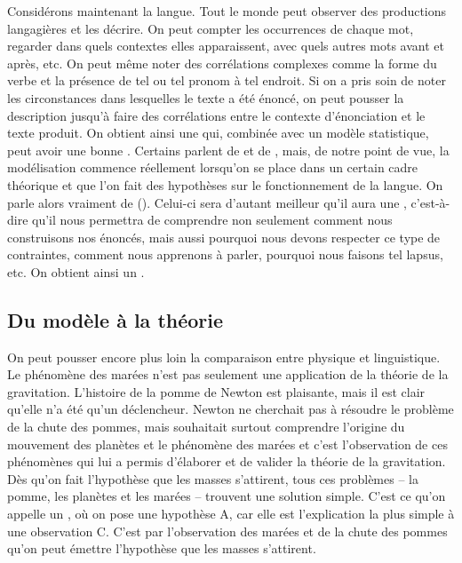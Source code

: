 Considérons maintenant la langue. Tout le monde peut observer des productions langagières et les décrire. On peut compter les occurrences de chaque mot, regarder dans quels contextes elles apparaissent, avec quels autres mots avant et après, etc. On peut même noter des corrélations complexes comme la forme du verbe et la présence de tel ou tel pronom à tel endroit. Si on a pris soin de noter les circonstances dans lesquelles le texte a été énoncé, on peut pousser la description jusqu’à faire des corrélations entre le contexte d’énonciation et le texte produit. On obtient ainsi une  qui, combinée avec un modèle statistique, peut avoir une bonne . Certains parlent de  et de , mais, de notre point de vue, la modélisation commence réellement lorsqu’on se place dans un certain cadre théorique et que l’on fait des hypothèses sur le fonctionnement de la langue. On parle alors vraiment de  (). Celui-ci sera d’autant meilleur qu’il aura une , c’est-à-dire qu’il nous permettra de comprendre non seulement comment nous construisons nos énoncés, mais aussi pourquoi nous devons respecter ce type de contraintes, comment nous apprenons à parler, pourquoi nous faisons tel lapsus, etc. On obtient ainsi un .

\subsection{Du modèle à la théorie}\largerpage

On peut pousser encore plus loin la comparaison entre physique et linguistique. Le phénomène des marées n’est pas seulement une application de la théorie de la gravitation. L’histoire de la pomme de Newton est plaisante, mais il est clair qu’elle n’a été qu’un déclencheur. Newton ne cherchait pas à résoudre le problème de la chute des pommes, mais souhaitait surtout comprendre l’origine du mouvement des planètes et le phénomène des marées et c’est l’observation de ces phénomènes qui lui a permis d’élaborer et de valider la théorie de la gravitation. Dès qu’on fait l’hypothèse que les masses s’attirent, tous ces problèmes – la pomme, les planètes et les marées – trouvent une solution simple. C’est ce qu’on appelle un , où on pose une hypothèse A, car elle est l’explication la plus simple à une observation C. C’est par l’observation des marées et de la chute des pommes qu’on peut émettre l’hypothèse que les masses s’attirent.

